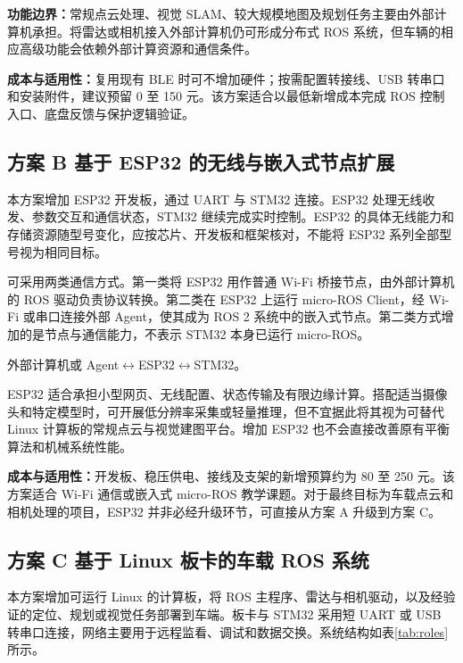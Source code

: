 \documentclass[UTF8,fontset=none,a4paper,11pt]{ctexart}
\begin{document}
\textbf{功能边界：}常规点云处理、视觉 SLAM、较大规模地图及规划任务主要由外部计算机承担。将雷达或相机接入外部计算机仍可形成分布式 ROS 系统，但车辆的相应高级功能会依赖外部计算资源和通信条件。

\textbf{成本与适用性：}复用现有 BLE 时可不增加硬件；按需配置转接线、USB 转串口和安装附件，建议预留 0 至 150 元。该方案适合以最低新增成本完成 ROS 控制入口、底盘反馈与保护逻辑验证。

\subsection{方案 B 基于 ESP32 的无线与嵌入式节点扩展}
本方案增加 ESP32 开发板，通过 UART 与 STM32 连接。ESP32 处理无线收发、参数交互和通信状态，STM32 继续完成实时控制。ESP32 的具体无线能力和存储资源随型号变化，应按芯片、开发板和框架核对，不能将 ESP32 系列全部型号视为相同目标\cite{esp32}。

可采用两类通信方式。第一类将 ESP32 用作普通 Wi-Fi 桥接节点，由外部计算机的 ROS 驱动负责协议转换。第二类在 ESP32 上运行 micro-ROS Client，经 Wi-Fi 或串口连接外部 Agent，使其成为 ROS 2 系统中的嵌入式节点\cite{uros_pio,uros_espidf}。第二类方式增加的是节点与通信能力，不表示 STM32 本身已运行 micro-ROS。

\begin{center}
外部计算机或 Agent\quad$\longleftrightarrow$\quad ESP32\quad$\longleftrightarrow$\quad STM32。
\end{center}

ESP32 适合承担小型网页、无线配置、状态传输及有限边缘计算。搭配适当摄像头和特定模型时，可开展低分辨率采集或轻量推理，但不宜据此将其视为可替代 Linux 计算板的常规点云与视觉建图平台。增加 ESP32 也不会直接改善原有平衡算法和机械系统性能。

\textbf{成本与适用性：}开发板、稳压供电、接线及支架的新增预算约为 80 至 250 元。该方案适合 Wi-Fi 通信或嵌入式 micro-ROS 教学课题。对于最终目标为车载点云和相机处理的项目，ESP32 并非必经升级环节，可直接从方案 A 升级到方案 C。

\subsection{方案 C 基于 Linux 板卡的车载 ROS 系统}
本方案增加可运行 Linux 的计算板，将 ROS 主程序、雷达与相机驱动，以及经验证的定位、规划或视觉任务部署到车端。板卡与 STM32 采用短 UART 或 USB 转串口连接，网络主要用于远程监看、调试和数据交换。系统结构如表\ref{tab:roles}所示。
\end{document}
